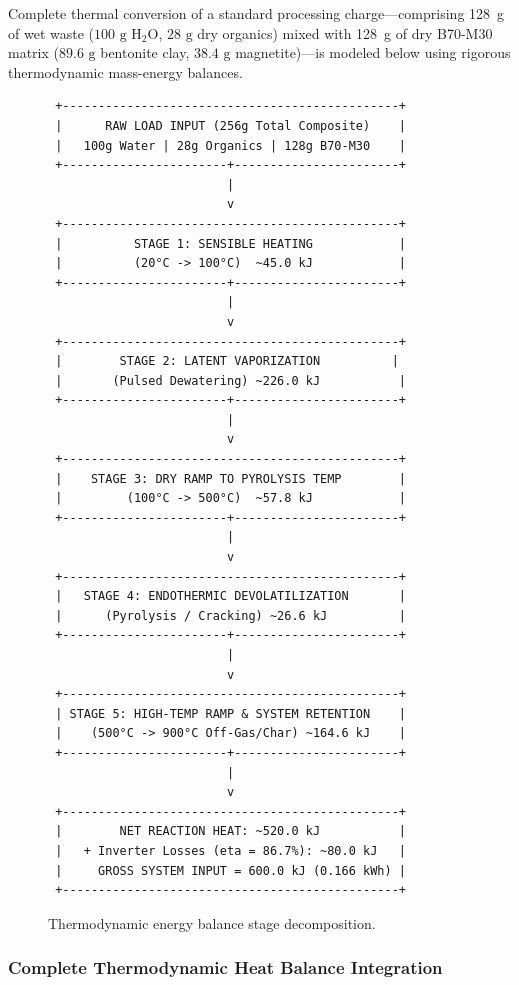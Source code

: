\documentclass[10pt,twocolumn,a4paper]{article}
\begin{document}
Complete thermal conversion of a standard processing charge—comprising 128~g of wet waste ($100\text{ g } \text{H}_2\text{O}$, $28\text{ g}$ dry organics) mixed with 128~g of dry B70-M30 matrix ($89.6\text{ g}$ bentonite clay, $38.4\text{ g}$ magnetite)—is modeled below using rigorous thermodynamic mass-energy balances.

\begin{figure}[H]
\centering
\small
\begin{verbatim}
 +-----------------------------------------------+
 |      RAW LOAD INPUT (256g Total Composite)    |
 |   100g Water | 28g Organics | 128g B70-M30    |
 +-----------------------+-----------------------+
                         |
                         v
 +-----------------------------------------------+
 |          STAGE 1: SENSIBLE HEATING            |
 |          (20°C -> 100°C)  ~45.0 kJ            |
 +-----------------------+-----------------------+
                         |
                         v
 +-----------------------------------------------+
 |        STAGE 2: LATENT VAPORIZATION          |
 |       (Pulsed Dewatering) ~226.0 kJ           |
 +-----------------------+-----------------------+
                         |
                         v
 +-----------------------------------------------+
 |    STAGE 3: DRY RAMP TO PYROLYSIS TEMP        |
 |         (100°C -> 500°C)  ~57.8 kJ            |
 +-----------------------+-----------------------+
                         |
                         v
 +-----------------------------------------------+
 |   STAGE 4: ENDOTHERMIC DEVOLATILIZATION       |
 |      (Pyrolysis / Cracking) ~26.6 kJ          |
 +-----------------------+-----------------------+
                         |
                         v
 +-----------------------------------------------+
 | STAGE 5: HIGH-TEMP RAMP & SYSTEM RETENTION    |
 |    (500°C -> 900°C Off-Gas/Char) ~164.6 kJ    |
 +-----------------------+-----------------------+
                         |
                         v
 +-----------------------------------------------+
 |        NET REACTION HEAT: ~520.0 kJ           |
 |   + Inverter Losses (eta = 86.7%): ~80.0 kJ   |
 |     GROSS SYSTEM INPUT = 600.0 kJ (0.166 kWh) |
 +-----------------------------------------------+
\end{verbatim}
\caption{Thermodynamic energy balance stage decomposition.}
\label{fig:energy_flow}
\end{figure}

\subsubsection*{Complete Thermodynamic Heat Balance Integration}
\end{document}
